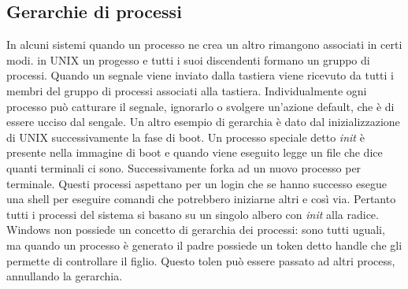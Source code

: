 \subsection{Gerarchie di processi}
In alcuni sistemi quando un processo ne crea un altro rimangono associati in certi modi. in UNIX un progesso e tutti i suoi discendenti formano un gruppo di processi. Quando un segnale
viene inviato dalla tastiera viene ricevuto da tutti i membri del gruppo di processi associati alla tastiera. Individualmente ogni processo pu\`o catturare il segnale, ignorarlo o 
svolgere un'azione default, che \`e di essere ucciso dal sengale. Un altro esempio di gerarchia \`e dato dal inizializzazione di UNIX successivamente la fase di boot. Un processo 
speciale detto \emph{init} \`e presente nella immagine di boot e quando viene eseguito legge un file che dice quanti terminali ci sono. Successivamente forka ad un nuovo processo per 
terminale. Questi processi aspettano per un login che se hanno successo esegue una shell per eseguire comandi che potrebbero iniziarne altri e cos\`i via. Pertanto tutti i processi
del sistema si basano su un singolo albero con \emph{init} alla radice. Windows non possiede un concetto di gerarchia dei processi: sono tutti uguali, ma quando un processo \`e generato
il padre possiede un token detto handle che gli permette di controllare il figlio. Questo tolen pu\`o essere passato ad altri process, annullando la gerarchia. 
